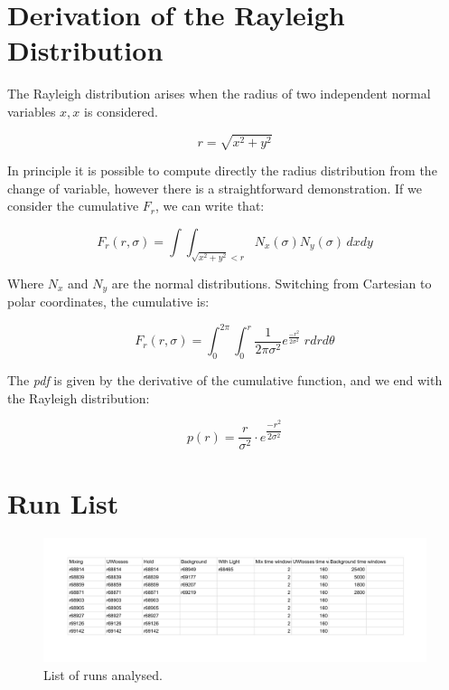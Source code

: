 \documentclass[11pt,a4paper,twocolumn]{article}
\begin{document}
\section{Derivation of the Rayleigh Distribution}
\label{sec:Rayleigh}

The Rayleigh distribution arises when the radius of two independent normal variables $x,x$ is considered.

\begin{equation*}
r = \sqrt{x^{2} + y^{2}}
\end{equation*} 


In principle it is possible to compute directly the radius distribution from the change of variable, however there is a straightforward demonstration. If we consider the cumulative $F_{r}$, we can write that:

\begin{equation*}
F_{r}(r, \sigma) = \int \int_{ \sqrt{x^{2} + y^{2}} < r} N_{x}(\sigma) N_{y}(\sigma) \, dx dy
\end{equation*}

Where $N_{x}$ and $N_{y}$ are the normal distributions. Switching from Cartesian to polar coordinates, the cumulative is:

\begin{equation*}
F_{r}(r, \sigma) =  \int_{0}^{2 \pi} \int_{0}^{r} \frac{1}{2 \pi \sigma^{2}}  e^{ \frac{- r^{2}}{2 \sigma^{2}}} \; r  dr d\theta
\end{equation*}


The \textit{pdf} is given by the derivative of the cumulative function, and we end with the Rayleigh distribution:


\begin{equation}
p(r) = \frac{r}{\sigma^{2}} \cdot  e^{ \dfrac{- r^{2}}{ 2 \sigma^{2}}}
\end{equation}


\section{Run List}

\label{fig:RunList}
\begin{figure}[hbtp]
\centering
\includegraphics[width = 1\textwidth]{../PlotMLEfit/ListofRun-cropped.pdf}
\caption{List of runs analysed.}
\end{figure}
\end{document}
